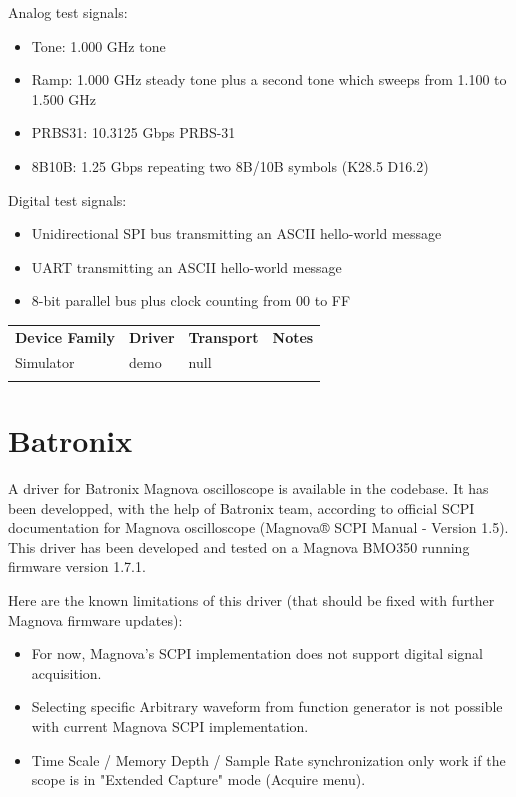 Analog test signals:
\begin{itemize}
\item Tone: 1.000 GHz tone
\item Ramp: 1.000 GHz steady tone plus a second tone which sweeps from 1.100 to 1.500 GHz
\item PRBS31: 10.3125 Gbps PRBS-31
\item 8B10B: 1.25 Gbps repeating two 8B/10B symbols (K28.5 D16.2)
\end{itemize}

Digital test signals:
\begin{itemize}
\item Unidirectional SPI bus transmitting an ASCII hello-world message
\item UART transmitting an ASCII hello-world message
\item 8-bit parallel bus plus clock counting from 00 to FF
\end{itemize}

\begin{tabularx}{16cm}{lllX}
\thickhline
\textbf{Device Family} & \textbf{Driver} & \textbf{Transport} & \textbf{Notes} \\
\thickhline
Simulator & demo & null & \\
\thickhline
\end{tabularx}

\section{Batronix}

A driver for Batronix Magnova oscilloscope is available in the codebase.
It has been developped, with the help of Batronix team, according to official SCPI documentation for Magnova oscilloscope
(Magnova® SCPI Manual - Version 1.5). This driver has been developed and tested on a Magnova BMO350 running firmware version 1.7.1.

Here are the known limitations of this driver (that should be fixed with further Magnova firmware updates):
\begin{itemize}

\item For now, Magnova's SCPI implementation does not support digital signal acquisition.

\item Selecting specific Arbitrary waveform from function generator is not possible with current Magnova SCPI implementation.

\item Time Scale / Memory Depth / Sample Rate synchronization only work if the scope is in "Extended Capture" mode (Acquire menu).

\end{itemize}

